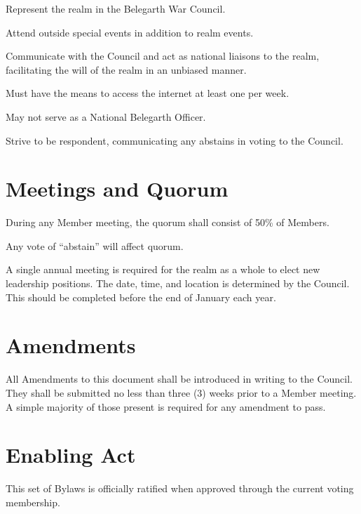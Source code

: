 \documentclass[12pt]{article}
\begin{document}
\begin{level}
\begin{level}
    \begin{level}
        \item Represent the realm in the Belegarth War Council.
        \item Attend outside special events in addition to realm events.
        \item Communicate with the Council and act as national liaisons to the realm, facilitating the will of the realm in an unbiased manner.
        \item Must have the means to access the internet at least one per week.
        \item May not serve as a National Belegarth Officer.
        \item Strive to be respondent, communicating any abstains in voting to the Council.
    \end{level}
\end{level}

\end{level}

\section{Meetings and Quorum}\label{yearly_meeting}
\begin{level} 
    \item  During any Member meeting, the quorum shall consist of 50\% of Members.
    \begin{level} 
        \item Any vote of “abstain” will affect quorum.
    \end{level}
    \item A single annual meeting is required for the realm as a whole to elect new leadership positions. The date, time, and location is determined by the Council. This should be completed before the end of January each year.
\end{level}

\section{Amendments}\label{amendments}
\begin{level} 
    \item All Amendments to this document shall be introduced in writing to the Council. They shall be submitted no less than three (3) weeks prior to a Member meeting. A simple majority of those present is required for any amendment to pass.
\end{level}

\section{Enabling Act}
\begin{level} 
    \item This set of Bylaws is officially ratified when approved through the current voting membership.
\end{level}

\end{document}
